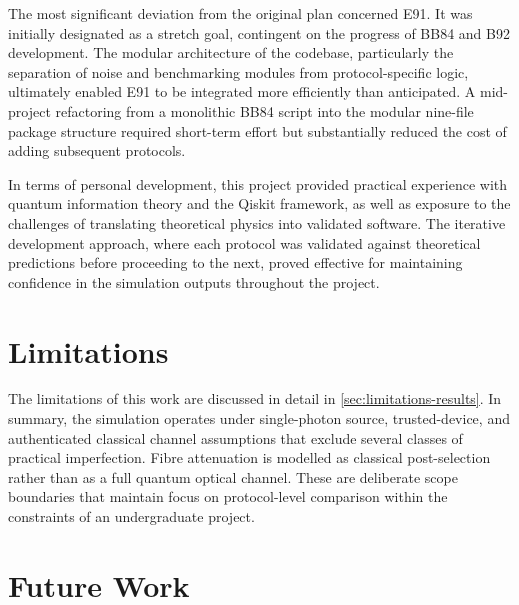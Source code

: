 The most significant deviation from the original plan concerned E91. It was initially designated as a stretch goal, contingent on the progress of BB84 and B92 development. The modular architecture of the codebase, particularly the separation of noise and benchmarking modules from protocol-specific logic, ultimately enabled E91 to be integrated more efficiently than anticipated. A mid-project refactoring from a monolithic BB84 script into the modular nine-file package structure required short-term effort but substantially reduced the cost of adding subsequent protocols.

In terms of personal development, this project provided practical experience with quantum information theory and the Qiskit framework, as well as exposure to the challenges of translating theoretical physics into validated software. The iterative development approach, where each protocol was validated against theoretical predictions before proceeding to the next, proved effective for maintaining confidence in the simulation outputs throughout the project.



\section{Limitations}

The limitations of this work are discussed in detail in \cref{sec:limitations-results}. In summary, the simulation operates under single-photon source, trusted-device, and authenticated classical channel assumptions that exclude several classes of practical imperfection. Fibre attenuation is modelled as classical post-selection rather than as a full quantum optical channel. These are deliberate scope boundaries that maintain focus on protocol-level comparison within the constraints of an undergraduate project.




\section{Future Work}

